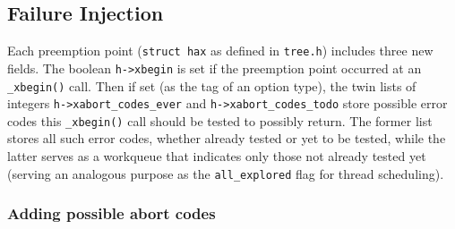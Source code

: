 \subsection{Failure Injection}
\label{sec:txn-failure}

Each preemption point ({\tt struct hax} as defined in {\tt tree.h})
includes three new fields.
The boolean {\tt h->xbegin} is set if the preemption point occurred at an {\tt \_xbegin()} call.
Then if set (as the tag of an option type),
the twin lists of integers
{\tt h->xabort\_codes\_ever}
and
{\tt h->xabort\_codes\_todo}
store possible error codes this {\tt \_xbegin()} call should be tested to possibly return.
The former list stores all such error codes, whether already tested or yet to be tested,
while the latter serves as a workqueue that indicates only those not already tested yet
(serving an analogous purpose as the {\tt all\_explored} flag for thread scheduling).

\subsubsection{Adding possible abort codes}
\label{sec:txn-abort-codes}

